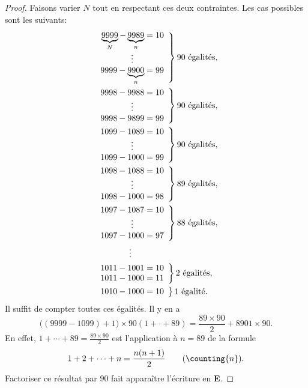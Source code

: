 \begin{proof}
Faisons varier $N$ tout en respectant ces deux contraintes. Les cas possibles sont les suivants:
%
\begin{align}
  &\left.
  \begin{array}{r@{{}={}}l}
    \underbrace{9999}_{N} - \underbrace{9989}_{n} & 10 \\
    \multicolumn{2}{c}{\vdots} \\
    9999 - \underbrace{9900}_{n} & 99
  \end{array}
  \right\} 90 \text{ égalités,}\\
%
%
%
  &\left.
  \begin{array}{r@{{}={}}l}
    9998 - 9988 & 10 \\
    \multicolumn{2}{c}{\vdots} \\
  9998 - 9899 & 99
  \end{array}
  \right\} 90 \text{ égalités,}\\
%
%
  &\left.
  \begin{array}{r@{{}={}}l}
    1099 - 1089 & 10 \\
    \multicolumn{2}{c}{\vdots} \\
  1099 - 1000 & 99
  \end{array}
  \right\} 90 \text{ égalités,}\\
%
  &\left.
  \begin{array}{r@{{}={}}l}
    1098 - 1088 & 10 \\
    \multicolumn{2}{c}{\vdots} \\
  1098 - 1000 & 98
  \end{array}
  \right\} 89 \text{ égalités,}\\
%
  &\left.
  \begin{array}{r@{{}={}}l}
    1097 - 1087 & 10 \\
    \multicolumn{2}{c}{\vdots} \\
  1097 - 1000 & 97
  \end{array}
  \right\} 88 \text{ égalités,}\\
%
& \hspace{4.2em}\vdots\\\nonumber
%
  &\left.
  \begin{array}{r@{{}={}}l}
    1011 - 1001 & 10 \\
   1011 - 1000 & 11  
  \end{array}
  \right\} 2 \text{ égalités,}\\
%
  &\left.
  \begin{array}{r@{{}={}}l}
    1010 - 1000 & 10 
  \end{array}
  \right\} 1 \text{ égalité. }
\end{align}
%
Il suffit de compter toutes ces égalités. Il y en a
%
\begin{equation}
\bigl((9999-1099) +1 \bigr) \times 90   (1+\cdot+89)  = \frac{89 \times 90}{2} + 8901 \times 90.
\end{equation}
En effet, %
$1+\cdots+89=\frac{89 \times 90}{2}$ est l'application à $n=89$ de la formule 
\begin{equation}
  1 + 2 +\cdots + n = \frac{n(n+1)}{2} \qquad (\counting{n}).
\end{equation}
%
Factoriser ce résultat par $90$ fait apparaître l'écriture en \textbf{E}.
\end{proof}